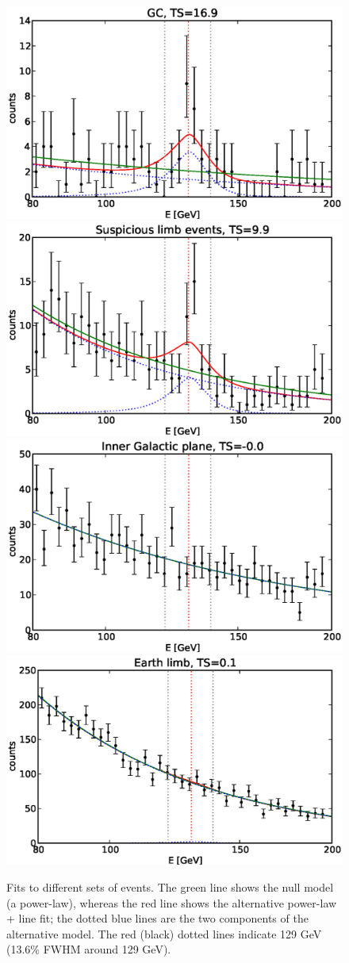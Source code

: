 \documentclass[aps,twocolumn,prd,superscriptaddress,showpacs,nofootinbib,fixfloat]{revtex4}
\begin{document}
\begin{figure}
  \centering
  \includegraphics[width=0.48\linewidth]{plots/counts_GC.eps}
  \includegraphics[width=0.48\linewidth]{plots/counts_suspiciousLimb.eps}
  \includegraphics[width=0.48\linewidth]{plots/counts_IGP.eps}
  \includegraphics[width=0.48\linewidth]{plots/counts_limb.eps}
  \caption{Fits to different sets of events. The green line shows the null
  model (a power-law), whereas the red line shows the alternative power-law +
  line fit; the dotted blue lines are the two components of the alternative
  model. The red (black) dotted lines indicate 129 GeV (13.6\% FWHM around 129
  GeV).}
  \label{fig:spectra1}
\end{figure}
\end{document}
